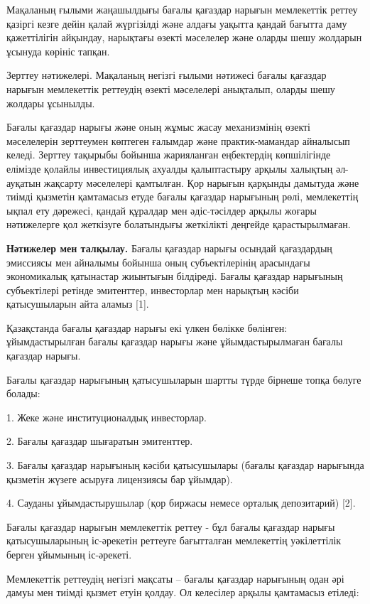 \begin{multicols}{2}
Мақаланың ғылыми жаңашылдығы бағалы қағаздар нарығын мемлекеттік реттеу
қазіргі кезге дейін қалай жүргізілді және алдағы уақытта қандай бағытта
даму қажеттілігін айқындау, нарықтағы өзекті мәселелер және оларды шешу
жолдарын ұсынуда көрініс тапқан.

Зерттеу нәтижелері. Мақаланың негізгі ғылыми нәтижесі бағалы қағаздар
нарығын мемлекеттік реттеудің өзекті мәселелері анықталып, оларды шешу
жолдары ұсынылды.

Бағалы қағаздар нарығы және оның жұмыс жасау механизмінің өзекті
мәселелерін зерттеумен көптеген ғалымдар және практик-мамандар айналысып
келеді. Зерттеу тақырыбы бойынша жарияланған еңбектердің көпшілігінде
елімізде қолайлы инвестициялық ахуалды қалыптастыру арқылы халықтың
әл-ауқатын жақсарту мәселелері қамтылған. Қор нарығын қарқынды дамытуда
және тиімді қызметін қамтамасыз етуде бағалы қағаздар нарығының рөлі,
мемлекеттің ықпал ету дәрежесі, қандай құралдар мен әдіс-тәсілдер арқылы
жоғары нәтижелерге қол жеткізуге болатындығы жеткілікті деңгейде
қарастырылмаған.

{\bfseries Нәтижелер мен талқылау.} Бағалы қағаздар нарығы осындай
қағаздардың эмиссиясы мен айналымы бойынша оның субъектілерінің
арасындағы экономикалық қатынастар жиынтығын білдіреді. Бағалы қағаздар
нарығының субъектілері ретінде эмитенттер, инвесторлар мен нарықтың
кәсіби қатысушыларын айта аламыз {[}1{]}.

Қазақстанда бағалы қағаздар нарығы екі үлкен бөлікке бөлінген:
ұйымдастырылған бағалы қағаздар нарығы және ұйымдастырылмаған бағалы
қағаздар нарығы.

Бағалы қағаздар нарығының қатысушыларын шартты түрде бірнеше топқа
бөлуге болады:

1.
Жеке және институционалдық инвесторлар.

2.
Бағалы қағаздар шығаратын эмитенттер.

3.
Бағалы қағаздар нарығының кәсіби қатысушылары (бағалы қағаздар
нарығында қызметін жүзеге асыруға лицензиясы бар ұйымдар).

4.
Сауданы ұйымдастырушылар (қор биржасы немесе орталық депозитарий)
{[}2{]}.

Бағалы қағаздар нарығын мемлекеттік реттеу - бұл бағалы қағаздар нарығы
қатысушыларының іс-әрекетін реттеуге бағытталған мемлекеттің
уәкілеттілік берген ұйымының іс-әрекеті.

Мемлекеттік реттеудің негізгі мақсаты -- бағалы қағаздар нарығының одан
әрі дамуы мен тиімді қызмет етуін қолдау. Ол келесілер арқылы қамтамасыз
етіледі:


\end{multicols}
